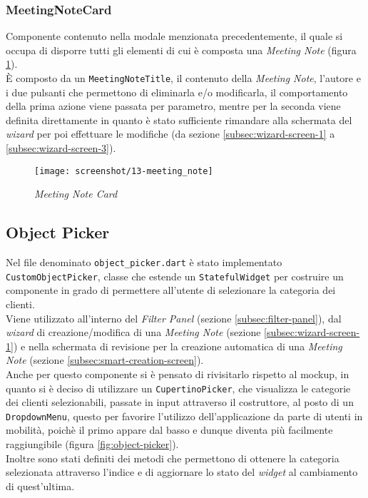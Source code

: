 \subsubsection*{MeetingNoteCard}
\label{subsubsec:meeting-note-card}

Componente contenuto nella modale menzionata precedentemente, il quale si occupa di disporre tutti gli elementi di cui è composta una \emph{Meeting Note} (figura \ref{fig:meeting-note-card}).\\
È composto da un \lstinline{MeetingNoteTitle}, il contenuto della \emph{Meeting Note}, l'autore e i due pulsanti che permettono di eliminarla e/o modificarla, il comportamento della prima azione viene passata per parametro, mentre per la seconda viene definita direttamente in quanto è stato sufficiente rimandare alla schermata del \emph{wizard} per poi effettuare le modifiche (da sezione \ref{subsec:wizard-screen-1} a \ref{subsec:wizard-screen-3}).

\begin{figure}[!h] 
    \centering 
    \texttt{[image: screenshot/13-meeting\_note]} 
    \caption{\emph{Meeting Note Card}}
    \label{fig:meeting-note-card}
\end{figure}

\subsection{Object Picker}
\label{subsec:object-picker}

Nel file denominato \lstinline{object_picker.dart} è stato implementato \lstinline{CustomObjectPicker}, classe che estende un \lstinline{StatefulWidget} per costruire un componente in grado di permettere all'utente di selezionare la categoria dei clienti. \\
Viene utilizzato all'interno del \emph{Filter Panel} (sezione \ref{subsec:filter-panel}), dal \emph{wizard} di creazione/modifica di una \emph{Meeting Note} (sezione \ref{subsec:wizard-screen-1}) e nella schermata di revisione per la creazione automatica di una \emph{Meeting Note} (sezione \ref{subsec:smart-creation-screen}).\\
Anche per questo componente si è pensato di rivisitarlo rispetto al \gls{mockup}\glsoccur, in quanto si è deciso di utilizzare un \lstinline{CupertinoPicker}\cite{site:cupertino-picker}, che visualizza le categorie dei clienti selezionabili, passate in input attraverso il costruttore, al posto di un \lstinline{DropdownMenu}\cite{site:dropdown-menu}, questo per favorire l'utilizzo dell'applicazione da parte di utenti in mobilità, poichè il primo appare dal basso e dunque diventa più facilmente raggiungibile (figura \ref{fig:object-picker}). \\
Inoltre sono stati definiti dei metodi che permettono di ottenere la categoria selezionata attraverso l'indice e di aggiornare lo stato del \emph{widget} al cambiamento di quest'ultima.

